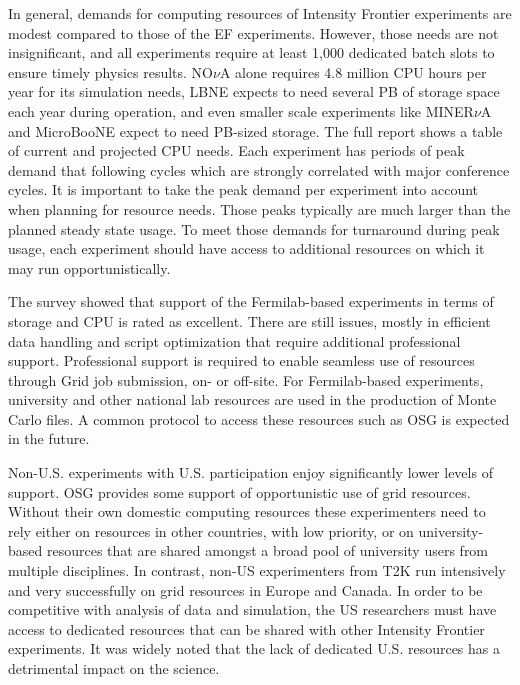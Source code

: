 In general, demands for computing resources of Intensity Frontier experiments are modest compared to those of the EF
experiments.  However, those needs are not insignificant, and all experiments
require at least 1,000 dedicated batch slots to ensure timely physics results. 
NO$\nu$A alone requires 4.8 million
CPU hours per year for its simulation needs, LBNE expects to need
several PB of storage space each year during operation, and even smaller scale
experiments like MINER$\nu$A and MicroBooNE expect to need PB-sized storage.
The full report shows a table of current and projected CPU needs. Each
experiment has periods of peak demand that following cycles which are strongly correlated with
major conference cycles.  It is important to take the peak demand per
experiment into account when planning for resource needs. Those peaks
typically are much larger than the planned steady state usage. To meet those
demands for turnaround during peak usage, each experiment should have access to
additional resources on which it may run opportunistically.

The survey showed that support of the Fermilab-based experiments in terms of
storage and CPU is rated as excellent.  There are still issues, mostly in efficient data 
handling and script optimization that require additional professional support. Professional support is required to
enable seamless use of resources through Grid job submission, on- or off-site.
For Fermilab-based experiments, university and other national lab resources
are used in the production of Monte Carlo files. A common protocol to access
these resources such as OSG is expected in the future.

Non-U.S. experiments with U.S. participation enjoy significantly
lower levels of support. OSG provides some support of opportunistic use of
grid resources.  Without their own domestic computing resources these
experimenters need to rely either on resources in other countries, with low
priority, or on university-based resources that are shared amongst a broad
pool of university users from multiple disciplines. In contrast, non-US experimenters
from T2K run intensively and very successfully on grid resources in Europe and
Canada.  In order to be competitive with analysis of data and simulation, the US 
researchers must have access to dedicated resources that can
be shared with other Intensity Frontier experiments. It was widely noted that the lack of dedicated U.S.
resources has a detrimental impact on the science.

